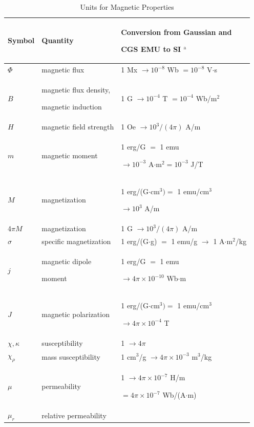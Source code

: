 \documentclass[journal,twoside,web]{ieeecolor}
\begin{document}
\begin{table}
    \caption{Units for Magnetic Properties}
    \label{table}
    \setlength{\tabcolsep}{3pt}
    \begin{tabular}{|p{25pt}|p{75pt}|p{115pt}|}
        \hline
        Symbol& 
        Quantity& 
        Conversion from Gaussian and \par CGS EMU to SI $^{\mathrm{a}}$ \\
        \hline
        $\Phi $& 
        magnetic flux& 
        1 Mx $\to  10^{-8}$ Wb $= 10^{-8}$ V$\cdot $s \\
        $B$& 
        magnetic flux density, \par magnetic induction& 
        1 G $\to  10^{-4}$ T $= 10^{-4}$ Wb/m$^{2}$ \\
        $H$& 
        magnetic field strength& 
        1 Oe $\to  10^{3}/(4\pi )$ A/m \\
        $m$& 
        magnetic moment& 
        1 erg/G $=$ 1 emu \par $\to 10^{-3}$ A$\cdot $m$^{2} = 10^{-3}$ J/T \\
        $M$& 
        magnetization& 
        1 erg/(G$\cdot $cm$^{3}) =$ 1 emu/cm$^{3}$ \par $\to 10^{3}$ A/m \\
        4$\pi M$& 
        magnetization& 
        1 G $\to  10^{3}/(4\pi )$ A/m \\
        $\sigma $& 
        specific magnetization& 
        1 erg/(G$\cdot $g) $=$ 1 emu/g $\to $ 1 A$\cdot $m$^{2}$/kg \\
        $j$& 
        magnetic dipole \par moment& 
        1 erg/G $=$ 1 emu \par $\to 4\pi \times  10^{-10}$ Wb$\cdot $m \\
        $J$& 
        magnetic polarization& 
        1 erg/(G$\cdot $cm$^{3}) =$ 1 emu/cm$^{3}$ \par $\to 4\pi \times  10^{-4}$ T \\
        $\chi , \kappa $& 
        susceptibility& 
        1 $\to  4\pi $ \\
        $\chi_{\rho }$& 
        mass susceptibility& 
        1 cm$^{3}$/g $\to  4\pi \times  10^{-3}$ m$^{3}$/kg \\
        $\mu $& 
        permeability& 
        1 $\to  4\pi \times  10^{-7}$ H/m \par $= 4\pi \times  10^{-7}$ Wb/(A$\cdot $m) \\
        $\mu_{r}$& 
        relative permeability& 

\end{tabular}
\end{table}
\end{document}

